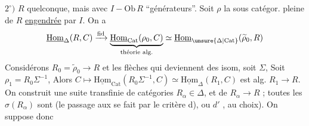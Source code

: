 $2^\circ)$ $R$ quelconque, mais avec $I\mathbin{-}\mathrm{Ob}\,R$ ``générateurs''. Soit $\rho$ la sous catégor. pleine de $R$ \uline{engendrée} par $I$. On a
\[
\underline{\mathrm{Hom}}_{\Delta}(R,C)\xrightarrow{\mathrm{fid}}
\underbrace{\underline{\mathrm{Hom}}_{\mathrm{Cat}}(\rho_0,C)}_{\text{théorie alg.}}
 \simeq\underline{\mathrm{Hom}}_{\unsure{\Delta|\mathrm{Cat}}}(\widetilde\rho_0,R)
\]
 Considérons $R_0=\widetilde\rho_0\longrightarrow R$ et les flèches qui deviennent des isom, soit $\Sigma$,  Soit  $\rho_1=R_0\Sigma^{-1}$,  Alors $C\mapsto\underline{\mathrm{Hom}}_{\mathrm{Cat}}(R_0\Sigma^{-1},C)\simeq\underline{\mathrm{Hom}}_{\Delta}(R_1,C)$ est alg. $R_1\to R$. On construit une suite transfinie de catégories $R_\alpha\in\Delta$, et de $R_\alpha\to R$ ; toutes les  $\sigma(R_\alpha)$ sont  (le passage aux  se fait par le critère d), ou $d'$\deleted{\unsure{)|!}} , au choix). On suppose donc

